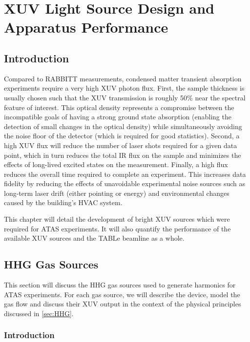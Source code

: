 \chapter{XUV Light Source Design and Apparatus Performance}
\label{chap:XUV_source_design_performance}

\section{Introduction}

Compared to RABBITT measurements, condensed matter transient absorption experiments require a very high XUV photon flux. First, the sample thickness is usually chosen such that the XUV transmission is roughly 50\% near the spectral feature of interest. This optical density represents a compromise between the incompatible goals of having a strong ground state absorption (enabling the detection of small changes in the optical density) while simultaneously avoiding the noise floor of the detector (which is required for good statistics). Second, a high XUV flux will reduce the number of laser shots required for a given data point, which in turn reduces the total IR flux on the sample and minimizes the effects of long-lived excited states on the measurement. Finally, a high flux reduces the overall time required to complete an experiment. This increases data fidelity by reducing the effects of unavoidable experimental noise sources such as long-term laser drift (either pointing or energy) and environmental changes caused by the building's HVAC system.

This chapter will detail the development of bright XUV sources which were required for ATAS experiments. It will also quantify the performance of the available XUV sources and the TABLe beamline as a whole.

\section{HHG Gas Sources}
\label{sec:HHG_gas_sources}

This section will discuss the HHG gas sources used to generate harmonics for ATAS experiments. For each gas source, we will describe the device, model the gas flow and discuss their XUV output in the context of the physical principles discussed in \cref{sec:HHG}.

\subsection{Introduction}

